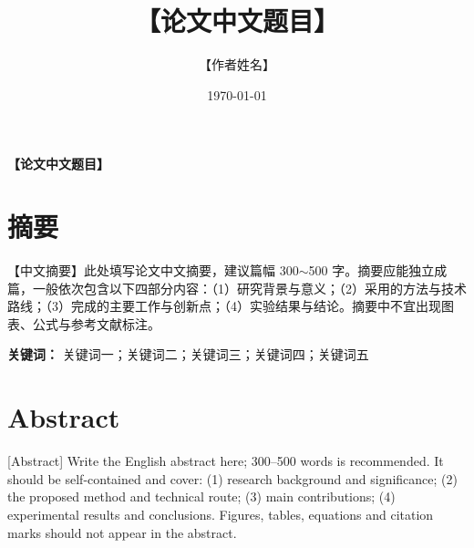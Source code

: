\documentclass[12pt,a4paper,UTF8]{ctexart}
\title{【论文中文题目】}
\author{【作者姓名】}
\date{\today}
\begin{document}
\cleardoublepage
\pagestyle{empty}

\cleardoublepage
\pagestyle{fancy}

% 

\newpage
\pagestyle{fancy}
\setcounter{page}{1}

\begin{center}
\bfseries
\fontsize{16}{19.2}\selectfont
【论文中文题目】
\end{center}

\vspace{0.1em}
\section*{摘\quad 要}

\vspace{0.5em}
【中文摘要】此处填写论文中文摘要，建议篇幅 300$\sim$500 字。摘要应能独立成篇，一般依次包含以下四部分内容：（1）研究背景与意义；（2）采用的方法与技术路线；（3）完成的主要工作与创新点；（4）实验结果与结论。摘要中不宜出现图表、公式与参考文献标注。

\vspace{1em}
{\bfseries 关键词：}
关键词一；关键词二；关键词三；关键词四；关键词五

\newpage

\begin{center}
\bfseries
\fontsize{16}{19.2}
\end{center}

\vspace{1em}
\section*{Abstract}

\vspace{0.5em}
[Abstract] Write the English abstract here; 300--500 words is recommended. It should be self-contained and cover: (1) research background and significance; (2) the proposed method and technical route; (3) main contributions; (4) experimental results and conclusions. Figures, tables, equations and citation marks should not appear in the abstract.
\end{document}
